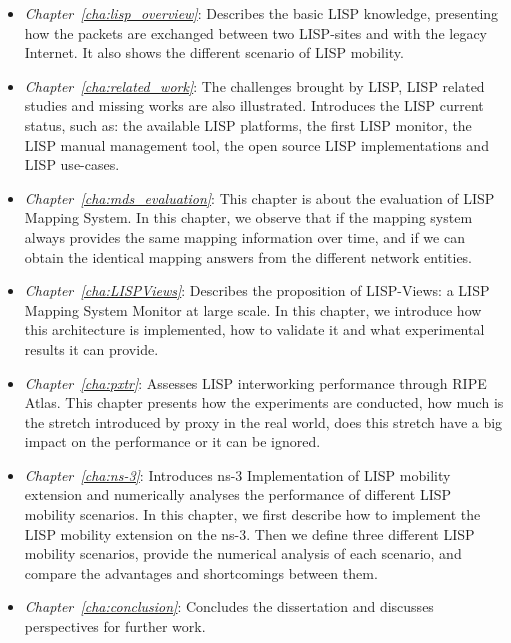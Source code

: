 \begin{itemize}[noitemsep,topsep=0pt]
	\item \emph{Chapter~\ref{cha:lisp_overview}}: Describes the basic LISP knowledge, presenting how the packets are exchanged between two LISP-sites and with the legacy Internet. It also shows the different scenario of LISP mobility.
	\item \emph{Chapter~\ref{cha:related_work}}: The challenges brought by LISP, LISP related studies and missing works are also illustrated. Introduces the LISP current status, such as: the available LISP platforms, the first LISP monitor, the LISP manual management tool, the open source LISP implementations and LISP use-cases.
    \item \emph{Chapter~\ref{cha:mds_evaluation}}: This chapter is about the evaluation of LISP Mapping System. In this chapter, we observe that if the mapping system always provides the same mapping information over time, and if we can obtain the identical mapping answers from the different network entities.
    \item \emph{Chapter~\ref{cha:LISPViews}}: Describes the proposition of LISP-Views: a LISP Mapping System Monitor at large scale. In this chapter, we introduce how this architecture is implemented, how to validate it and what experimental results it can provide.
    \item \emph{Chapter~\ref{cha:pxtr}}: Assesses LISP interworking performance through RIPE Atlas. This chapter presents how the experiments are conducted, how much is the stretch introduced by proxy in the real world, does this stretch have a big impact on the performance or it can be ignored.
    \item \emph{Chapter~\ref{cha:ns-3}}: Introduces ns-3 Implementation of LISP mobility extension and numerically analyses the performance of different LISP mobility scenarios. In this chapter, we first describe how to implement the LISP mobility extension on the ns-3. Then we define three different LISP mobility scenarios, provide the numerical analysis of each scenario, and compare the advantages and shortcomings between them. 
    \item \emph{Chapter~\ref{cha:conclusion}}: Concludes the dissertation and discusses perspectives for further work.
\end{itemize}